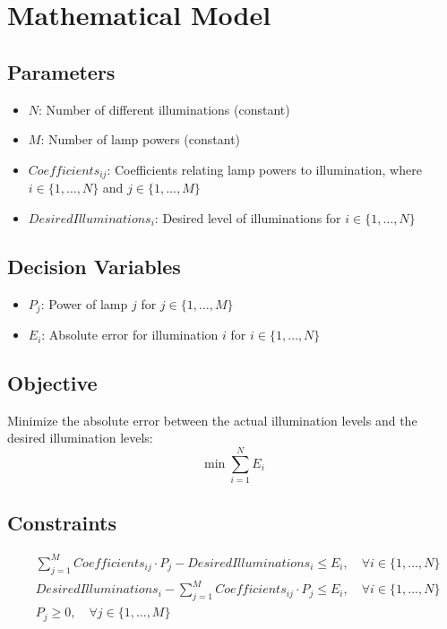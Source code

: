 \documentclass{article}
\begin{document}
\section*{Mathematical Model}

\subsection*{Parameters}
\begin{itemize}
    \item $N$: Number of different illuminations (constant)
    \item $M$: Number of lamp powers (constant)
    \item $Coefficients_{ij}$: Coefficients relating lamp powers to illumination, where $i \in \{1, \ldots, N\}$ and $j \in \{1, \ldots, M\}$
    \item $DesiredIlluminations_i$: Desired level of illuminations for $i \in \{1, \ldots, N\}$
\end{itemize}

\subsection*{Decision Variables}
\begin{itemize}
    \item $P_j$: Power of lamp $j$ for $j \in \{1, \ldots, M\}$
    \item $E_i$: Absolute error for illumination $i$ for $i \in \{1, \ldots, N\}$
\end{itemize}

\subsection*{Objective}
Minimize the absolute error between the actual illumination levels and the desired illumination levels:
\[
\min \sum_{i=1}^{N} E_i
\]

\subsection*{Constraints}
\begin{align}
    &\sum_{j=1}^{M} Coefficients_{ij} \cdot P_j - DesiredIlluminations_i \leq E_i, \quad \forall i \in \{1, \ldots, N\} \\
    &DesiredIlluminations_i - \sum_{j=1}^{M} Coefficients_{ij} \cdot P_j \leq E_i, \quad \forall i \in \{1, \ldots, N\} \\
    &P_j \geq 0, \quad \forall j \in \{1, \ldots, M\}
\end{align}
\end{document}
